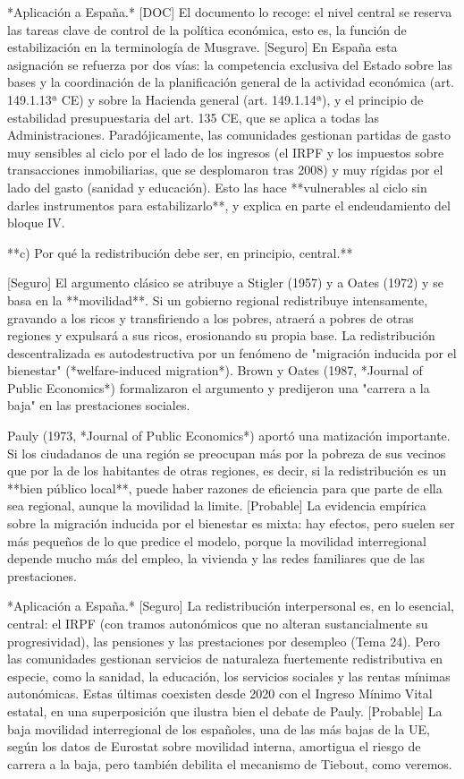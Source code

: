 \documentclass[10pt,a4paper]{article}
\begin{document}
*Aplicación a España.* [DOC] El documento lo recoge: el nivel central se reserva las tareas clave de control de la política económica, esto es, la función de estabilización en la terminología de Musgrave. [Seguro] En España esta asignación se refuerza por dos vías: la competencia exclusiva del Estado sobre las bases y la coordinación de la planificación general de la actividad económica (art. 149.1.13ª CE) y sobre la Hacienda general (art. 149.1.14ª), y el principio de estabilidad presupuestaria del art. 135 CE, que se aplica a todas las Administraciones. Paradójicamente, las comunidades gestionan partidas de gasto muy sensibles al ciclo por el lado de los ingresos (el IRPF y los impuestos sobre transacciones inmobiliarias, que se desplomaron tras 2008) y muy rígidas por el lado del gasto (sanidad y educación). Esto las hace **vulnerables al ciclo sin darles instrumentos para estabilizarlo**, y explica en parte el endeudamiento del bloque IV.

**c) Por qué la redistribución debe ser, en principio, central.**

[Seguro] El argumento clásico se atribuye a Stigler (1957) y a Oates (1972) y se basa en la **movilidad**. Si un gobierno regional redistribuye intensamente, gravando a los ricos y transfiriendo a los pobres, atraerá a pobres de otras regiones y expulsará a sus ricos, erosionando su propia base. La redistribución descentralizada es autodestructiva por un fenómeno de "migración inducida por el bienestar" (*welfare-induced migration*). Brown y Oates (1987, *Journal of Public Economics*) formalizaron el argumento y predijeron una "carrera a la baja" en las prestaciones sociales.

Pauly (1973, *Journal of Public Economics*) aportó una matización importante. Si los ciudadanos de una región se preocupan más por la pobreza de sus vecinos que por la de los habitantes de otras regiones, es decir, si la redistribución es un **bien público local**, puede haber razones de eficiencia para que parte de ella sea regional, aunque la movilidad la limite. [Probable] La evidencia empírica sobre la migración inducida por el bienestar es mixta: hay efectos, pero suelen ser más pequeños de lo que predice el modelo, porque la movilidad interregional depende mucho más del empleo, la vivienda y las redes familiares que de las prestaciones.

*Aplicación a España.* [Seguro] La redistribución interpersonal es, en lo esencial, central: el IRPF (con tramos autonómicos que no alteran sustancialmente su progresividad), las pensiones y las prestaciones por desempleo (Tema 24). Pero las comunidades gestionan servicios de naturaleza fuertemente redistributiva en especie, como la sanidad, la educación, los servicios sociales y las rentas mínimas autonómicas. Estas últimas coexisten desde 2020 con el Ingreso Mínimo Vital estatal, en una superposición que ilustra bien el debate de Pauly. [Probable] La baja movilidad interregional de los españoles, una de las más bajas de la UE, según los datos de Eurostat sobre movilidad interna, amortigua el riesgo de carrera a la baja, pero también debilita el mecanismo de Tiebout, como veremos.
\end{document}
